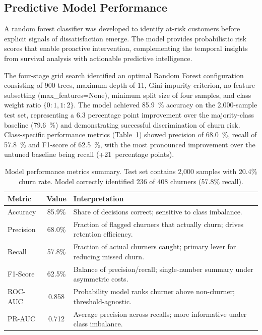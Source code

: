 \documentclass[12pt]{article}
\begin{document}
\subsection{Predictive Model Performance}
A random forest classifier was developed to identify at-risk customers before explicit signals of dissatisfaction emerge. The model provides probabilistic risk scores that enable proactive intervention, complementing the temporal insights from survival analysis with actionable predictive intelligence.

The four-stage grid search identified an optimal Random Forest configuration consisting of 900 trees, maximum depth of 11, Gini impurity criterion, no feature subsetting (max\_features=None), minimum split size of four samples, and class weight ratio \(\{0:1,1:2\}\). The model achieved 85.9~\% accuracy on the 2,000-sample test set, representing a 6.3 percentage point improvement over the majority-class baseline (79.6~\%) and demonstrating successful discrimination of churn risk. Class-specific performance metrics (Table~\ref{tab:model_performance}) showed precision of 68.0~\%, recall of 57.8~\% and F1‑score of 62.5~\%, with the most pronounced improvement over the untuned baseline being recall (+21~percentage points).

\begin{table}[H]
\centering
\small
\caption{Model performance metrics summary. Test set contains 2,000 samples with 20.4\% churn rate. Model correctly identified 236 of 408 churners (57.8\% recall).}
\label{tab:model_performance}
\begin{tabular}{lcp{9.5cm}}
\toprule
\textbf{Metric} & \textbf{Value} & \textbf{Interpretation} \\
\midrule
Accuracy & 85.9\% & Share of decisions correct; sensitive to class imbalance. \\
\cmidrule(lr){1-3}
Precision & 68.0\% & Fraction of flagged churners that actually churn; drives retention efficiency. \\
\cmidrule(lr){1-3}
Recall & 57.8\% & Fraction of actual churners caught; primary lever for reducing missed churn. \\
\cmidrule(lr){1-3}
F1-Score & 62.5\% & Balance of precision/recall; single-number summary under asymmetric costs. \\
\cmidrule(lr){1-3}
ROC-AUC & 0.858 & Probability model ranks churner above non-churner; threshold-agnostic. \\
\cmidrule(lr){1-3}
PR-AUC & 0.712 & Average precision across recalls; more informative under class imbalance. \\
\bottomrule
\end{tabular}
\end{table}
\end{document}
